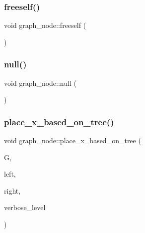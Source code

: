 \subsubsection{\texorpdfstring{freeself()}{freeself()}}
{\footnotesize\ttfamily void graph\+\_\+node\+::freeself (\begin{DoxyParamCaption}{ }\end{DoxyParamCaption})}

\mbox{\label{classgraph__node_a1c367f072f259d75c5debb41011e7328}} 
\subsubsection{\texorpdfstring{null()}{null()}}
{\footnotesize\ttfamily void graph\+\_\+node\+::null (\begin{DoxyParamCaption}{ }\end{DoxyParamCaption})}

\mbox{\label{classgraph__node_a83a7a05169473dd6957146b735658857}} 
\subsubsection{\texorpdfstring{place\+\_\+x\+\_\+based\+\_\+on\+\_\+tree()}{place\_x\_based\_on\_tree()}}
{\footnotesize\ttfamily void graph\+\_\+node\+::place\+\_\+x\+\_\+based\+\_\+on\+\_\+tree (\begin{DoxyParamCaption}\item[{\mbox{\hyperlink{classlayered__graph}{layered\+\_\+graph}} $\ast$}]{G,  }\item[{double}]{left,  }\item[{double}]{right,  }\item[{\mbox{\hyperlink{galois_8h_a09fddde158a3a20bd2dcadb609de11dc}{I\+NT}}}]{verbose\+\_\+level }\end{DoxyParamCaption})}

\mbox{\label{classgraph__node_a0536d089bebf0e578673b5d1b90f3a20}} 
